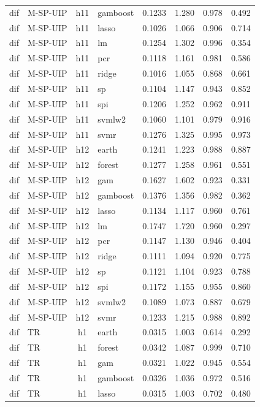 \begin{ThreePartTable}
\begin{longtable}[t]{llclcccc}
dif & M-SP-UIP & h11 & gamboost & 0.1233 & 1.280 & 0.978 & 0.492\\
dif & M-SP-UIP & h11 & lasso & 0.1026 & 1.066 & 0.906 & 0.714\\
dif & M-SP-UIP & h11 & lm & 0.1254 & 1.302 & 0.996 & 0.354\\
dif & M-SP-UIP & h11 & pcr & 0.1118 & 1.161 & 0.981 & 0.586\\
dif & M-SP-UIP & h11 & ridge & 0.1016 & 1.055 & 0.868 & 0.661\\
dif & M-SP-UIP & h11 & sp & 0.1104 & 1.147 & 0.943 & 0.852\\
dif & M-SP-UIP & h11 & spi & 0.1206 & 1.252 & 0.962 & 0.911\\
dif & M-SP-UIP & h11 & svmlw2 & 0.1060 & 1.101 & 0.979 & 0.916\\
dif & M-SP-UIP & h11 & svmr & 0.1276 & 1.325 & 0.995 & 0.973\\
\addlinespace
dif & M-SP-UIP & h12 & earth & 0.1241 & 1.223 & 0.988 & 0.887\\
dif & M-SP-UIP & h12 & forest & 0.1277 & 1.258 & 0.961 & 0.551\\
dif & M-SP-UIP & h12 & gam & 0.1627 & 1.602 & 0.923 & 0.331\\
dif & M-SP-UIP & h12 & gamboost & 0.1376 & 1.356 & 0.982 & 0.362\\
dif & M-SP-UIP & h12 & lasso & 0.1134 & 1.117 & 0.960 & 0.761\\
dif & M-SP-UIP & h12 & lm & 0.1747 & 1.720 & 0.960 & 0.297\\
dif & M-SP-UIP & h12 & pcr & 0.1147 & 1.130 & 0.946 & 0.404\\
dif & M-SP-UIP & h12 & ridge & 0.1111 & 1.094 & 0.920 & 0.775\\
dif & M-SP-UIP & h12 & sp & 0.1121 & 1.104 & 0.923 & 0.788\\
dif & M-SP-UIP & h12 & spi & 0.1172 & 1.155 & 0.955 & 0.860\\
dif & M-SP-UIP & h12 & svmlw2 & 0.1089 & 1.073 & 0.887 & 0.679\\
dif & M-SP-UIP & h12 & svmr & 0.1233 & 1.215 & 0.988 & 0.892\\
\addlinespace
dif & TR & h1 & earth & 0.0315 & 1.003 & 0.614 & 0.292\\
dif & TR & h1 & forest & 0.0342 & 1.087 & 0.999 & 0.710\\
dif & TR & h1 & gam & 0.0321 & 1.022 & 0.945 & 0.554\\
dif & TR & h1 & gamboost & 0.0326 & 1.036 & 0.972 & 0.516\\
dif & TR & h1 & lasso & 0.0315 & 1.003 & 0.702 & 0.480\\

\end{longtable}
\end{ThreePartTable}

